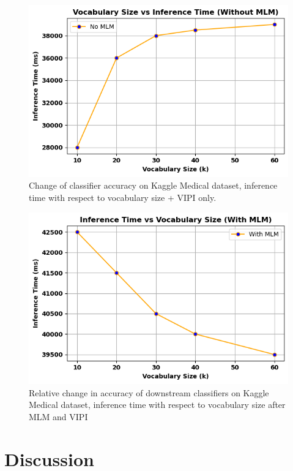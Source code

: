 \documentclass[11pt]{article}
\begin{document}
\begin{figure}[h]
		\centering
    	\includegraphics[scale=0.5]{clf_plot.png}    
    	\caption{Change of classifier accuracy on Kaggle Medical dataset, inference time with respect to vocabulary size + VIPI only. }
    	\label{fig:inf_time}
\end{figure}

\begin{figure}[h]
		\centering
    	\includegraphics[scale=0.5]{mlm_plot.png}    
    	\caption{Relative change in accuracy of downstream classifiers on Kaggle Medical dataset, inference time with respect to vocabulary size after MLM and VIPI}
    	\label{fig:mlm_inf_time}
\end{figure}


\section{Discussion}
\end{document}
